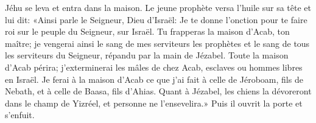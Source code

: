 Jéhu se leva et entra dans la maison.
Le jeune prophète versa l’huile sur sa tête et lui dit:
	«Ainsi parle le Seigneur, Dieu d’Israël:
	Je te donne l’onction pour te faire roi sur le peuple du Seigneur, sur Israël.
	Tu frapperas la maison d’Acab, ton maître;
	je vengerai ainsi le sang de mes serviteurs les prophètes
	et le sang de tous les serviteurs du Seigneur, répandu par la main de Jézabel.
Toute la maison d’Acab périra;
	j’exterminerai les mâles de chez Acab, esclaves ou hommes libres en Israël.
Je ferai à la maison d’Acab ce que j’ai fait à celle de Jéroboam, fils de Nebath,
	et à celle de Baasa, fils d’Ahias.
Quant à Jézabel, les chiens la dévoreront dans le champ de Yizréel,
	et personne ne l’ensevelira.»
Puis il ouvrit la porte et s’enfuit.
